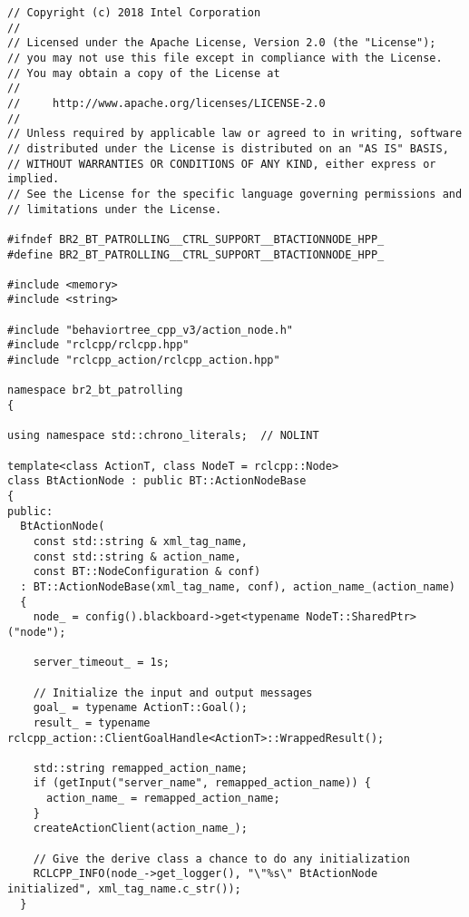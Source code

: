  \footnotesize
\begin{tcolorbox}[sharp corners, colframe=gray!80, colback=LightGray, left=0pt, top=0pt, bottom=0pt, title=\texttt{br2\_bt\_patrolling/include/br2\_bt\_patrolling/ctrl\_support/BTActionNode.hpp}]
  \begin{verbatim}
// Copyright (c) 2018 Intel Corporation
//
// Licensed under the Apache License, Version 2.0 (the "License");
// you may not use this file except in compliance with the License.
// You may obtain a copy of the License at
//
//     http://www.apache.org/licenses/LICENSE-2.0
//
// Unless required by applicable law or agreed to in writing, software
// distributed under the License is distributed on an "AS IS" BASIS,
// WITHOUT WARRANTIES OR CONDITIONS OF ANY KIND, either express or implied.
// See the License for the specific language governing permissions and
// limitations under the License.

#ifndef BR2_BT_PATROLLING__CTRL_SUPPORT__BTACTIONNODE_HPP_
#define BR2_BT_PATROLLING__CTRL_SUPPORT__BTACTIONNODE_HPP_

#include <memory>
#include <string>

#include "behaviortree_cpp_v3/action_node.h"
#include "rclcpp/rclcpp.hpp"
#include "rclcpp_action/rclcpp_action.hpp"

namespace br2_bt_patrolling
{

using namespace std::chrono_literals;  // NOLINT

template<class ActionT, class NodeT = rclcpp::Node>
class BtActionNode : public BT::ActionNodeBase
{
public:
  BtActionNode(
    const std::string & xml_tag_name,
    const std::string & action_name,
    const BT::NodeConfiguration & conf)
  : BT::ActionNodeBase(xml_tag_name, conf), action_name_(action_name)
  {
    node_ = config().blackboard->get<typename NodeT::SharedPtr>("node");

    server_timeout_ = 1s;

    // Initialize the input and output messages
    goal_ = typename ActionT::Goal();
    result_ = typename rclcpp_action::ClientGoalHandle<ActionT>::WrappedResult();

    std::string remapped_action_name;
    if (getInput("server_name", remapped_action_name)) {
      action_name_ = remapped_action_name;
    }
    createActionClient(action_name_);

    // Give the derive class a chance to do any initialization
    RCLCPP_INFO(node_->get_logger(), "\"%s\" BtActionNode initialized", xml_tag_name.c_str());
  }


\end{verbatim}
\end{tcolorbox}
